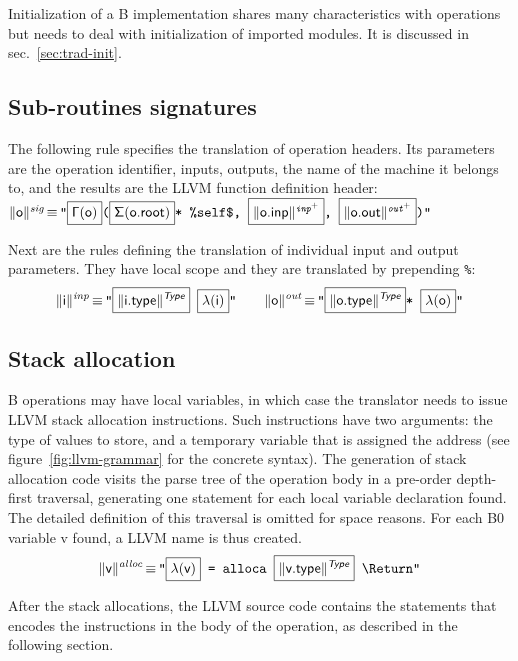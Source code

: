 \documentclass{llncs}
\newcommand{\trad}[2]{\ensuremath{\lVert \textsf{#1} \rVert^{\textit{#2}}}}
\newcommand{\nl}[0]{\text{\Return}}
\DeclareMathOperator{\isdef}{\equiv}
\newcommand{\llvm}[1]{\texttt{#1}}
\newcommand{\B}[1]{\textsf{#1}}
\newcommand{\ListOf}[1]{$\mbox{#1}^+$}
\newcommand{\PH}[1]{\framebox{$#1$}}
\newcommand{\Global}[0]{\ensuremath{\sf\Gamma}}
\newcommand{\local}[0]{\ensuremath{\sf\lambda}}
\newcommand{\state}[0]{\ensuremath{\sf\Sigma}}
\begin{document}
Initialization of a B implementation shares many characteristics with operations
but needs to deal with initialization of imported modules. It is discussed in
sec.~\ref{sec:trad-init}.

\subsection{Sub-routines signatures}
\label{sec:trad-header}

The following rule specifies the translation of operation headers. Its
parameters are the operation identifier, inputs, outputs, the name of the
machine it belongs to, and the results are the LLVM function definition
header: \\
\noindent$\trad{\B{o}}{sig} \isdef \llvm{"\PH{\Global(\B{o})}(\PH{\state(\B{o.root})}* \%self\$, \PH{\trad{\B{o.inp}}{\ListOf{inp}}}, \PH{\trad{\B{o.out}}{\ListOf{out}}})"}$

Next are the rules defining the translation of individual input and output
parameters. They have local scope and they are translated by prepending
\llvm{\%}:
\begin{align*}
  \trad{i}{inp} \isdef 
  \llvm{"\PH{\trad{i.type}{\B{Type}}} \PH{\local(\B{i})}"} \quad \quad
  \trad{o}{out} \isdef 
  \llvm{"\PH{\trad{o.type}{\B{Type}}}* \PH{\local(\B{o})}"}
\end{align*}

\subsection{Stack allocation}
\label{sec:trad-alloc}

B operations may have local variables, in which case the translator needs to
issue LLVM stack allocation instructions. Such instructions have two arguments:
the type of values to store, and a temporary variable that is assigned the
address (see figure~\ref{fig:llvm-grammar} for the concrete syntax). The
generation of stack allocation code visits the parse tree of the operation body
in a pre-order depth-first traversal, generating one statement for each local
variable declaration found. The detailed definition of this traversal is omitted
for space reasons. For each B0 variable \B{v} found, a LLVM name is thus
created.
\begin{align*}
  \trad{v}{alloc} \isdef 
  \llvm{"\PH{\local(\B{v})} = alloca \PH{\trad{v.type}{\B{Type}}} \nl"}
\end{align*}

After the stack allocations, the LLVM source code contains the statements that
encodes the instructions in the body of the operation, as described in the
following section.
\end{document}
